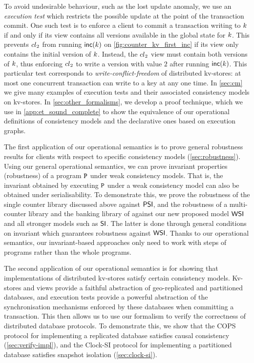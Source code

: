 To avoid undesirable behaviour, such as the lost update anomaly, we
use an {\em execution test} which restricts the possible update at the
point of the transaction commit.  One such test is to enforce a client
to commit a transaction writing to $k$ if and only if its view
contains all versions available in the global state for $k$.  This
prevents ${cl}_2$ from running $\mathsf{inc}(k)$ on
\cref{fig:counter_kv_first_inc} if its view only contains the initial
version of $k$.  Instead, the ${cl}_2$ view must contain both
versions of $k$, thus enforcing ${cl}_2$ to write a version with
value $2$ after running $\mathsf{inc}(k)$. This particular test
corresponds to \emph{write-conflict-freedom} of distributed kv-stores:
at most one concurrent transaction can write to a key at any one time.
In \cref{sec:cm} we give many examples of execution tests and their
associated consistency models on kv-stores. In \cref{sec:other_formalisms}, we
develop a proof technique, which we use in \cref{app:et_sound_complete} 
to show the equivalence of our operational definitions of consistency models and the 
declarative ones based on  
execution graphs. 

The first application of our operational semantics is to prove
general robustness results for clients with respect to specific
consistency models (\cref{sec:robustness}). 
Using our general operational semantics, we can prove invariant properties (\eg robustness)
of a program $\mathtt{P}$ under weak consistency models. 
That is, the invariant obtained by executing $\mathtt{P}$ under a weak consistency model can also be obtained under serialisability.
To demonstrate this, we prove the robustness of the single
counter library discussed above against $\mathsf{PSI}$, and the robustness of a multi-counter library and the banking library of \citet{bank-example-wsi}
against our new proposed model $\mathsf{WSI}$ and all stronger models such as $\mathsf{SI}$.
The latter is done through general conditions on invariant which guarantees robustness against \( \mathsf{WSI} \).
Thanks to our operational semantics, our invariant-based approaches only need to work with steps of programs rather than the whole programs.

The second application of our operational
semantics is for showing that implementations of distributed
kv-stores satisfy certain consistency models. 
Kv-stores and views provide a 
faithful abstraction of geo-replicated and partitioned
databases, and  execution tests provide a powerful abstraction of the synchronisation mechanisms 
enforced by these databases when committing a transaction. 
This then allows us to use our 
formalism to verify the correctness of distributed database protocols. 
To demonstrate this, we show that the
COPS protocol \citep{cops} for implementing a replicated database satisfies causal consistency  (\cref{sec:verify-impl}), 
and the Clock-SI protocol \citep{clocksi} for implementing a
partitioned database satisfies snapshot isolation (\cref{sec:clock-si}). 


